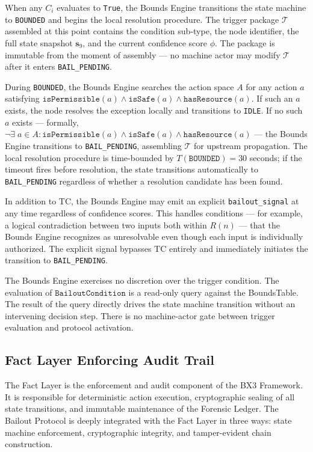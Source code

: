 When any $C_i$ evaluates to \texttt{True}, the Bounds Engine transitions the state
machine to \texttt{BOUNDED} and begins the local resolution procedure. The trigger
package $\mathcal{T}$ assembled at this point contains the condition sub-type, the
node identifier, the full state snapshot $\mathbf{s}_9$, and the current confidence
score $\phi$. The package is immutable from the moment of assembly — no machine actor
may modify $\mathcal{T}$ after it enters \texttt{BAIL\_PENDING}.

During \texttt{BOUNDED}, the Bounds Engine searches the action space $A$ for any
action $a$ satisfying
$\texttt{isPermissible}(a) \land \texttt{isSafe}(a) \land \texttt{hasResource}(a)$.
If such an $a$ exists, the node resolves the exception locally and transitions to
\texttt{IDLE}. If no such $a$ exists — formally,
$\neg \exists \; a \in A : \texttt{isPermissible}(a) \land \texttt{isSafe}(a) \land \texttt{hasResource}(a)$
— the Bounds Engine transitions to \texttt{BAIL\_PENDING}, assembling $\mathcal{T}$
for upstream propagation. The local resolution procedure is time-bounded by
$T(\texttt{BOUNDED}) = 30$ seconds; if the timeout fires before resolution, the
state transitions automatically to \texttt{BAIL\_PENDING} regardless of whether a
resolution candidate has been found.

In addition to TC, the Bounds Engine may emit an explicit \texttt{bailout\_signal}
at any time regardless of confidence scores. This handles conditions — for example,
a logical contradiction between two inputs both within $R(n)$ — that the Bounds
Engine recognizes as unresolvable even though each input is individually authorized.
The explicit signal bypasses TC entirely and immediately initiates the transition
to \texttt{BAIL\_PENDING}.

The Bounds Engine exercises no discretion over the trigger condition. The
evaluation of $\texttt{BailoutCondition}$ is a read-only query against the
BoundsTable. The result of the query directly drives the state machine transition
without an intervening decision step. There is no machine-actor gate between trigger
evaluation and protocol activation.

\subsection{Fact Layer Enforcing Audit Trail}
\label{sec:fact-layer}

The Fact Layer is the enforcement and audit component of the BX3 Framework. It is
responsible for deterministic action execution, cryptographic sealing of all state
transitions, and immutable maintenance of the Forensic Ledger. The Bailout Protocol
is deeply integrated with the Fact Layer in three ways: state machine enforcement,
cryptographic integrity, and tamper-evident chain construction.

